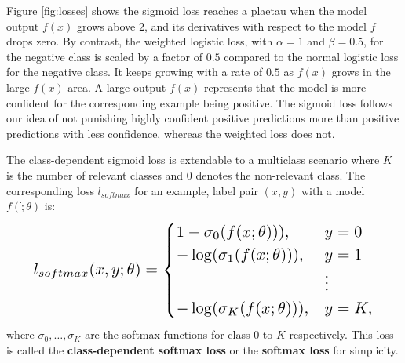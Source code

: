 Figure \ref{fig:losses} shows the sigmoid loss reaches a plaetau when the model output $f(x)$ grows above $2$, and its derivatives with respect to the model $f$ drops zero.
By contrast, the weighted logistic loss, with $\alpha=1$ and $\beta=0.5$, for the negative class is scaled by a factor of $0.5$ compared to the normal logistic loss for the negative class.
It keeps growing with a rate of $0.5$ as $f(x)$ grows in the large $f(x)$ area.
A large output $f(x)$ represents that the model is more confident for the corresponding example being positive.
The sigmoid loss follows our idea of not punishing highly confident positive predictions more than positive predictions with less confidence, whereas the weighted loss does not.

The class-dependent sigmoid loss is extendable to a multiclass scenario where $K$ is the number of relevant classes and $0$ denotes the non-relevant class.
The corresponding loss $l_{softmax}$ for an example, label pair $(x,y)$ with a model $f(\dot;\theta)$ is:
\begin{eqnarray}
\resizebox{0.9\columnwidth}{!}{$
l_{softmax}(x, y; \theta) =
  \begin{cases}
    1 - \sigma_0(f(x;\theta))), & y = 0 \\
    - \log (\sigma_1(f(x;\theta))), & y = 1 \\
                                   & \vdots \\
    - \log (\sigma_K(f(x;\theta))), & y = K,
  \end{cases}
  $}
\end{eqnarray}
where $\sigma_0, \dots, \sigma_K$ are the softmax functions for class $0$ to $K$ respectively.
This loss is called the \textbf{class-dependent softmax loss} or the \textbf{softmax loss} for simplicity.


